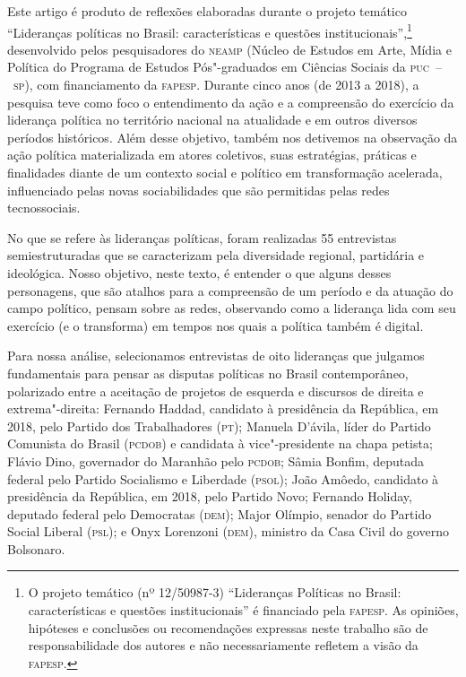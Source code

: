 \noindent{}Este artigo é produto de reflexões elaboradas durante o projeto temático
``Lideranças políticas no Brasil: características e questões
institucionais'',\footnote{O projeto temático (nº 12/50987-3)
  ``Lideranças Políticas no Brasil: características e questões
  institucionais'' é financiado pela \textsc{fapesp}. As opiniões, hipóteses e
  conclusões ou recomendações expressas neste trabalho são de
  responsabilidade dos autores e não necessariamente refletem a visão da
  \textsc{fapesp}.} desenvolvido pelos pesquisadores do \textsc{neamp} (Núcleo de Estudos
em Arte, Mídia e Política do Programa de Estudos Pós"-graduados em
Ciências Sociais da \textsc{puc~--~sp}), com financiamento da \textsc{fapesp}. Durante cinco
anos (de 2013 a 2018), a pesquisa teve como foco o entendimento da ação
e a compreensão do exercício da liderança política no território
nacional na atualidade e em outros diversos períodos históricos. Além
desse objetivo, também nos detivemos na observação da ação política
materializada em atores coletivos, suas estratégias, práticas e
finalidades diante de um contexto social e político em transformação
acelerada, influenciado pelas novas sociabilidades que são permitidas
pelas redes tecnossociais.

No que se refere às lideranças políticas, foram realizadas 55
entrevistas semiestruturadas que se caracterizam pela diversidade
regional, partidária e ideológica. Nosso objetivo, neste texto, é
entender o que alguns desses personagens, que são atalhos para a
compreensão de um período e da atuação do campo político, pensam sobre
as redes, observando como a liderança lida com seu exercício (e o
transforma) em tempos nos quais a política também é digital.

Para nossa análise, selecionamos entrevistas de oito lideranças que
julgamos fundamentais para pensar as disputas políticas no Brasil
contemporâneo, polarizado entre a aceitação de projetos de esquerda e
discursos de direita e extrema"-direita: Fernando Haddad, candidato à
presidência da República, em 2018, pelo Partido dos Trabalhadores (\textsc{pt});
Manuela D'ávila, líder do Partido Comunista do Brasil (\textsc{pcdob}) e
candidata à vice"-presidente na chapa petista; Flávio Dino, governador do
Maranhão pelo \textsc{pcdob}; Sâmia Bonfim, deputada federal pelo Partido
Socialismo e Liberdade (\textsc{psol}); João Amôedo, candidato à presidência da
República, em 2018, pelo Partido Novo; Fernando Holiday, deputado
federal pelo Democratas (\textsc{dem}); Major Olímpio, senador do Partido Social
Liberal (\textsc{psl}); e Onyx Lorenzoni (\textsc{dem}), ministro da Casa Civil do governo
Bolsonaro.


